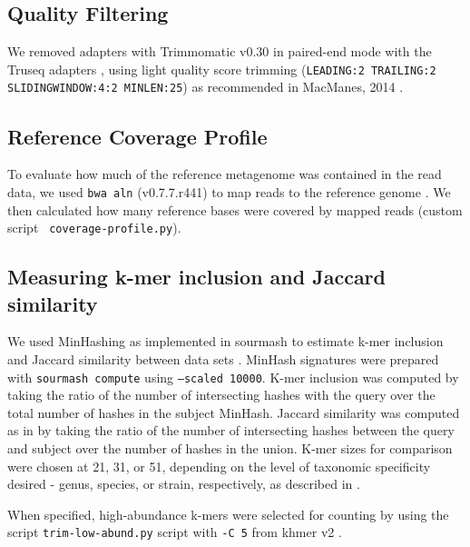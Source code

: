 \documentclass[11pt]{article}
\begin{document}
\subsection*{Quality Filtering} 

We removed adapters with Trimmomatic v0.30 in paired-end mode with the
Truseq adapters \cite{trimmomatic}, using light quality score trimming
({\tt LEADING:2 TRAILING:2 SLIDINGWINDOW:4:2 MINLEN:25})
as recommended in MacManes, 2014 \cite{macmanes2014optimal}.


\subsection*{Reference Coverage Profile}

To evaluate how much of the reference metagenome was contained in the
read data, we used {\tt bwa aln} (v0.7.7.r441) to map reads to the
reference genome \cite{bwa}.  We then calculated how many reference
bases were covered by mapped reads (custom script {\tt
  coverage-profile.py}).

\subsection*{Measuring k-mer inclusion and Jaccard similarity}

We used MinHashing as implemented in sourmash to estimate k-mer
inclusion and Jaccard similarity between data sets \cite{sourmash}.
MinHash signatures were prepared with {\tt sourmash compute} using
{\tt --scaled 10000}.  K-mer inclusion was computed by taking the ratio of
the number of intersecting hashes with the query over the total number
of hashes in the subject MinHash. Jaccard similarity was computed as
in \cite{mash} by taking the ratio of the number of intersecting
hashes between the query and subject over the number of hashes in the
union.  K-mer sizes for comparison were chosen at 21, 31, or 51,
depending on the level of taxonomic specificity desired - genus,
species, or strain, respectively, as described in \cite{metapalette}.

When specified, high-abundance k-mers were selected for counting by
using the script {\tt trim-low-abund.py} script with {\tt -C 5} from
khmer v2 \cite{streaming, khmer2}.
\end{document}
